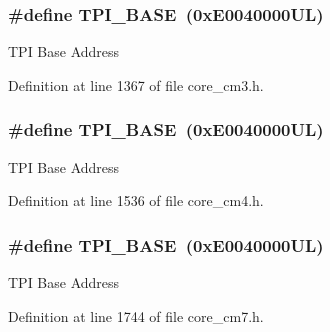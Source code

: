 \subsubsection[{\texorpdfstring{T\+P\+I\+\_\+\+B\+A\+SE}{TPI_BASE}}]{\setlength{\rightskip}{0pt plus 5cm}\#define T\+P\+I\+\_\+\+B\+A\+SE~(0x\+E0040000\+U\+L)}\hypertarget{group___c_m_s_i_s__core__base_ga2b1eeff850a7e418844ca847145a1a68}{}\label{group___c_m_s_i_s__core__base_ga2b1eeff850a7e418844ca847145a1a68}
T\+PI Base Address 

Definition at line 1367 of file core\+\_\+cm3.\+h.

\subsubsection[{\texorpdfstring{T\+P\+I\+\_\+\+B\+A\+SE}{TPI_BASE}}]{\setlength{\rightskip}{0pt plus 5cm}\#define T\+P\+I\+\_\+\+B\+A\+SE~(0x\+E0040000\+U\+L)}\hypertarget{group___c_m_s_i_s__core__base_ga2b1eeff850a7e418844ca847145a1a68}{}\label{group___c_m_s_i_s__core__base_ga2b1eeff850a7e418844ca847145a1a68}
T\+PI Base Address 

Definition at line 1536 of file core\+\_\+cm4.\+h.

\subsubsection[{\texorpdfstring{T\+P\+I\+\_\+\+B\+A\+SE}{TPI_BASE}}]{\setlength{\rightskip}{0pt plus 5cm}\#define T\+P\+I\+\_\+\+B\+A\+SE~(0x\+E0040000\+U\+L)}\hypertarget{group___c_m_s_i_s__core__base_ga2b1eeff850a7e418844ca847145a1a68}{}\label{group___c_m_s_i_s__core__base_ga2b1eeff850a7e418844ca847145a1a68}
T\+PI Base Address 

Definition at line 1744 of file core\+\_\+cm7.\+h.

